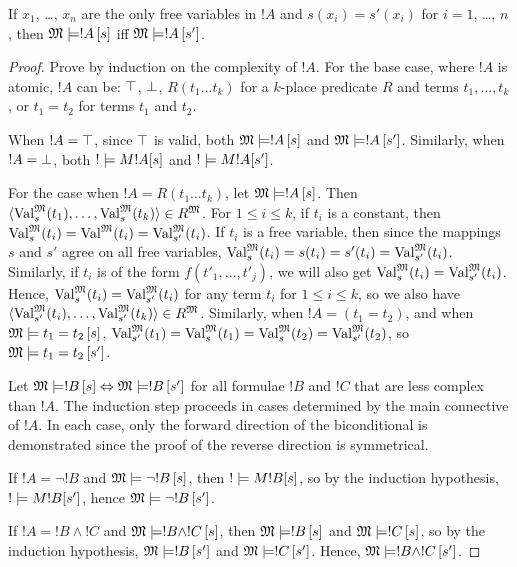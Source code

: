 \documentclass[syntax-and-semantics]{subfiles}
\begin{document}
\begin{prop}
If $x_1$, \dots, $x_n$ are the only free variables in $!A$ and $s(x_i)
= s'(x_i)$ for $i = 1$, \dots, $n$, then $\Sat{M}{!A}[s]$ iff
$\Sat{M}{!A}[s']$.
\end{prop}

\begin{proof}

Prove by induction on the complexity of $!A$. For the base case, where $!A$ is atomic, $!A$ can be: $\top$, $\bot$, $R(t_1 \ldots t_k)$ for a $k$-place predicate $R$ and terms $t_1,\ldots,t_k$, or $t_1 = t_2$ for terms $t_1$ and $t_2$.

When $!A = \top$, since $\top$ is valid, both $\Sat{M}{!A}[s]$ and $\Sat{M}{!A}[s']$. Similarly, when $!A = \bot$, both $\Sat!{M}{!A}[s]$ and $\Sat!{M}{!A}[s']$. 

For the case when $!A = R(t_1 \ldots t_k)$, let $\Sat{M}{!A}[s]$. Then $\langle \Value{t_1}{M}[s], \ldots, \Value{t_k}{M}[s] \rangle \in \Assign{R}{M}$. For $1 \leq i \leq k$, if $t_i$ is a constant, then $\Value{t_i}{M}[s] = \Value{t_i}{M} = \Value{t_i}{M}[s']$. If $t_i$ is a free variable, then since the mappings $s$ and $s'$ agree on all free variables, $\Value{t_i}{M}[s] = s(t_i) = s'(t_i) = \Value{t_i}{M}[s']$. Similarly, if $t_i$ is of the form $f(t'_1,\ldots,t'_j)$, we will also get $\Value{t_i}{M}[s] = \Value{t_i}{M}[s']$. Hence, $\Value{t_i}{M}[s] = \Value{t_i}{M}[s']$ for any term $t_i$ for $1 \leq i \leq k$, so we also have $\langle \Value{t_i}{M}[s'], \ldots, \Value{t_k}{M}[s'] \rangle \in \Assign{R}{M}$. Similarly, when $!A = (t_1 = t_2)$, and when $\Sat{M}{t_1 = t_2}[s]$, $\Value{t_1}{M}[s'] = \Value{t_1}{M}[s] = \Value{t_2}{M}[s] = \Value{t_2}{M}[s']$, so $\Sat{M}{t_1 = t_2}[s']$.

Let $\Sat{M}{!B}[s] \Leftrightarrow \Sat{M}{!B}[s']$ for all formulae $!B$ and $!C$ that are less complex than $!A$. The induction step proceeds in cases determined by the main connective of $!A$. In each case, only the forward direction of the biconditional is demonstrated since the proof of the reverse direction is symmetrical.

If $!A = \lnot !B$ and $\Sat{M}{\lnot !B}[s]$, then $\Sat!{M}{!B}[s]$, so by the induction hypothesis, $\Sat!{M}{!B}[s']$, hence $\Sat{M}{\lnot !B}[s']$.

If $!A = !B \land !C$ and $\Sat{M}{!B \land !C}[s]$, then $\Sat{M}{!B}[s]$ and $\Sat{M}{!C}[s]$, so by the induction hypothesis, $\Sat{M}{!B}[s']$ and $\Sat{M}{!C}[s']$. Hence, $\Sat{M}{!B \land !C}[s']$.


\end{proof}
\end{document}
